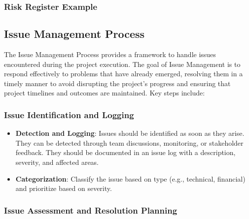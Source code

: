\documentclass[a4paper,12pt]{article}
\begin{document}
\subsubsection*{Risk Register Example}
\begin{table}[h!]
    \centering
    \label{tab:risk_register}
\end{table}

\subsection{\textcolor{EUblue}{Issue Management Process}} 
The Issue Management Process provides a framework to handle issues encountered during the project execution. The goal of Issue Management is to respond effectively to problems that have already emerged, resolving them in a timely manner to avoid disrupting the project's progress and ensuring that project timelines and outcomes are maintained. Key steps include:

\subsubsection*{Issue Identification and Logging} 

\begin{itemize}[left=1em, itemsep=0pt, topsep=0pt] 
    \item \textbf{Detection and Logging}: Issues should be identified as soon as they arise. They can be detected through team discussions, monitoring, or stakeholder feedback. They should be documented in an issue log with a description, severity, and affected areas.
    \item \textbf{Categorization}: Classify the issue based on type (e.g., technical, financial) and prioritize based on severity.
\end{itemize}

\subsubsection*{Issue Assessment and Resolution Planning} 
\end{document}
